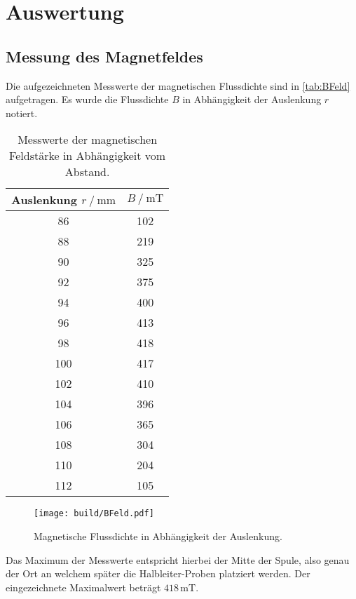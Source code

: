 \section{Auswertung}
\label{sec:Auswertung}




\subsection{Messung des Magnetfeldes}
\label{sec:AuswB}
Die aufgezeichneten Messwerte der magnetischen Flussdichte sind in \autoref{tab:BFeld} aufgetragen.
Es wurde die Flussdichte $B$ in Abhängigkeit der Auslenkung $r$ notiert.
\begin{table}
    \centering
    \caption{Messwerte der magnetischen Feldstärke in Abhängigkeit vom Abstand.}
    \begin{tabular}{c c  }
        \toprule
        Auslenkung $r \mathbin{/}\unit{\milli \meter}$& $B\mathbin{/}\unit{\milli \tesla}$\\
        \midrule
        86	&102\\
        88&	219\\
        90&	325\\
        92&	375\\
        94&	400\\
        96&	413\\
        98&	418\\
        100&417\\
        102&410\\
        104&396\\
        106&365\\
        108&304\\
        110&204\\
        112&105\\
        \bottomrule
    \end{tabular}
    \label{tab:BFeld}
\end{table}

\begin{figure}[H]
    \centering
    \texttt{[image: build/BFeld.pdf]}
    \caption{Magnetische Flussdichte in Abhängigkeit der Auslenkung.}
    \label{fig:BFeld}
\end{figure}
Das Maximum der Messwerte entspricht hierbei der Mitte der Spule, also genau der Ort an welchem später die Halbleiter-Proben platziert werden.
Der eingezeichnete Maximalwert beträgt $418\, \unit{\milli \tesla}$.

